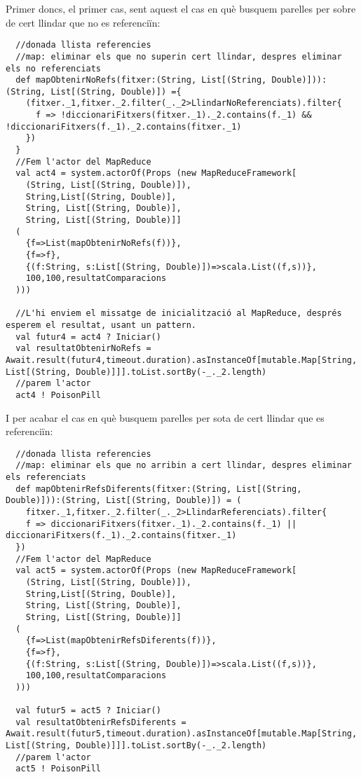 \documentclass[11pt,a4paper,twoside]{report}
\begin{document}
Primer doncs, el primer cas, sent aquest el cas en què busquem parelles per sobre de cert llindar que no es referenciïn:
\begin{lstlisting}
  //donada llista referencies
  //map: eliminar els que no superin cert llindar, despres eliminar els no referenciats
  def mapObtenirNoRefs(fitxer:(String, List[(String, Double)])):(String, List[(String, Double)]) ={
    (fitxer._1,fitxer._2.filter(_._2>LlindarNoReferenciats).filter{
      f => !diccionariFitxers(fitxer._1)._2.contains(f._1) && !diccionariFitxers(f._1)._2.contains(fitxer._1)
    })
  }
  //Fem l'actor del MapReduce
  val act4 = system.actorOf(Props (new MapReduceFramework[
    (String, List[(String, Double)]),
    String,List[(String, Double)],
    String, List[(String, Double)],
    String, List[(String, Double)]]
  (
    {f=>List(mapObtenirNoRefs(f))},
    {f=>f},
    {(f:String, s:List[(String, Double)])=>scala.List((f,s))},
    100,100,resultatComparacions
  )))

  //L'hi enviem el missatge de inicialització al MapReduce, després esperem el resultat, usant un pattern.
  val futur4 = act4 ? Iniciar()
  val resultatObtenirNoRefs = Await.result(futur4,timeout.duration).asInstanceOf[mutable.Map[String, List[(String, Double)]]].toList.sortBy(-_._2.length)
  //parem l'actor
  act4 ! PoisonPill
\end{lstlisting}

I per acabar el cas en què busquem parelles per sota de cert llindar que es referenciïn:

\begin{lstlisting}
  //donada llista referencies
  //map: eliminar els que no arribin a cert llindar, despres eliminar els referenciats
  def mapObtenirRefsDiferents(fitxer:(String, List[(String, Double)])):(String, List[(String, Double)]) = (
    fitxer._1,fitxer._2.filter(_._2>LlindarReferenciats).filter{
    f => diccionariFitxers(fitxer._1)._2.contains(f._1) || diccionariFitxers(f._1)._2.contains(fitxer._1)
  })
  //Fem l'actor del MapReduce
  val act5 = system.actorOf(Props (new MapReduceFramework[
    (String, List[(String, Double)]),
    String,List[(String, Double)],
    String, List[(String, Double)],
    String, List[(String, Double)]]
  (
    {f=>List(mapObtenirRefsDiferents(f))},
    {f=>f},
    {(f:String, s:List[(String, Double)])=>scala.List((f,s))},
    100,100,resultatComparacions
  )))

  val futur5 = act5 ? Iniciar()
  val resultatObtenirRefsDiferents = Await.result(futur5,timeout.duration).asInstanceOf[mutable.Map[String, List[(String, Double)]]].toList.sortBy(-_._2.length)
  //parem l'actor
  act5 ! PoisonPill
\end{lstlisting}
\end{document}

